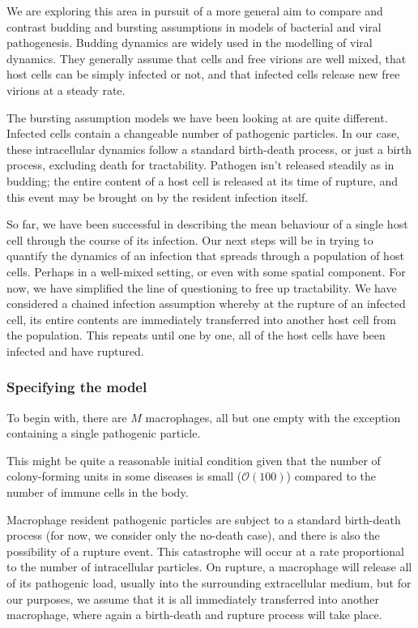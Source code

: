 We are exploring this area in pursuit of a more general aim to compare and contrast budding and bursting assumptions in models of bacterial and viral pathogenesis. Budding dynamics are widely used in the modelling of viral dynamics. They generally assume that cells and free virions are well mixed, that host cells can be simply infected or not, and that infected cells release new free virions at a steady rate.\par
The bursting assumption models we have been looking at are quite different. Infected cells contain a changeable number of pathogenic particles. In our case, these intracellular dynamics follow a standard birth-death process, or just a birth process, excluding death for tractability. Pathogen isn't released steadily as in budding; the entire content of a host cell is released at its time of rupture, and this event may be brought on by the resident infection itself. \par
So far, we have been successful in describing the mean behaviour of a single host cell through the course of its infection. Our next steps will be in trying to quantify the dynamics of an infection that spreads through a population of host cells. Perhaps in a well-mixed setting, or even with some spatial component. For now, we have simplified the line of questioning to free up tractability. We have considered a chained infection assumption whereby at the rupture of an infected cell, its entire contents are immediately transferred into another host cell from the population. This repeats until one by one, all of the host cells have been infected and have ruptured. 



\subsubsection*{Specifying the model}


To begin with, there are $M$ macrophages, all but one empty with the exception containing a single pathogenic particle. 

This might be quite a reasonable initial condition given that the number of colony-forming units in some diseases is small ($\mathcal{O}(100)$) compared to the number of immune cells in the body.


Macrophage resident pathogenic particles are subject to a standard birth-death process (for now, we consider only the no-death case), and there is also the possibility of a rupture event. This catastrophe will occur at a rate proportional to the number of intracellular particles. On rupture, a macrophage will release all of its pathogenic load, usually into the surrounding extracellular medium, but for our purposes, we assume that it is all immediately transferred into another macrophage, where again a birth-death and rupture process will take place. 

